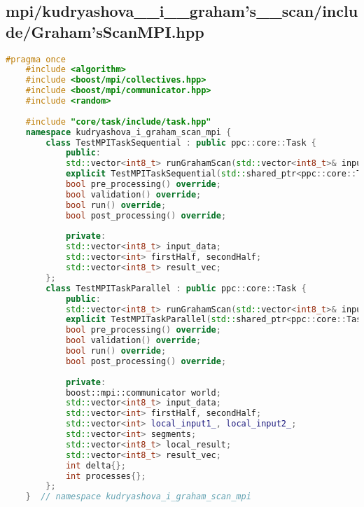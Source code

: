 \documentclass[a4paper,12pt]{article}
\begin{document}
\subsection*{mpi/kudryashova\_\_i\_\_graham's\_\_scan/include/Graham'sScanMPI.hpp}
\begin{lstlisting}[language=C++]
	#pragma once
	#include <algorithm>
	#include <boost/mpi/collectives.hpp>
	#include <boost/mpi/communicator.hpp>
	#include <random>
	
	#include "core/task/include/task.hpp"
	namespace kudryashova_i_graham_scan_mpi {
		class TestMPITaskSequential : public ppc::core::Task {
			public:
			std::vector<int8_t> runGrahamScan(std::vector<int8_t>& input_data);
			explicit TestMPITaskSequential(std::shared_ptr<ppc::core::TaskData> taskData_) : Task(std::move(taskData_)) {}
			bool pre_processing() override;
			bool validation() override;
			bool run() override;
			bool post_processing() override;
			
			private:
			std::vector<int8_t> input_data;
			std::vector<int> firstHalf, secondHalf;
			std::vector<int8_t> result_vec;
		};
		class TestMPITaskParallel : public ppc::core::Task {
			public:
			std::vector<int8_t> runGrahamScan(std::vector<int8_t>& input_data);
			explicit TestMPITaskParallel(std::shared_ptr<ppc::core::TaskData> taskData_) : Task(std::move(taskData_)) {}
			bool pre_processing() override;
			bool validation() override;
			bool run() override;
			bool post_processing() override;
			
			private:
			boost::mpi::communicator world;
			std::vector<int8_t> input_data;
			std::vector<int> firstHalf, secondHalf;
			std::vector<int> local_input1_, local_input2_;
			std::vector<int> segments;
			std::vector<int8_t> local_result;
			std::vector<int8_t> result_vec;
			int delta{};
			int processes{};
		};
	}  // namespace kudryashova_i_graham_scan_mpi
\end{lstlisting}
\end{document}
